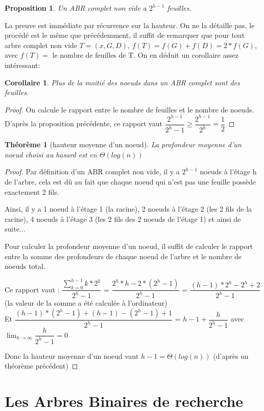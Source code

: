 \documentclass{report}
\newtheorem*{theo}{\textbf{Théorème}}
\newtheorem*{petiteprop}{Proposition}
\newtheorem*{cor}{Corollaire}
\begin{document}
\begin{petiteprop}
Un ABR complet non vide a $2^{h-1}$ feuilles.
\end{petiteprop}
La preuve est immédiate par récurrence sur la hauteur. On ne la détaille pas, le procédé est le même que précédemment, il suffit de remarquer que pour tout arbre complet non vide $T = (x,G,D)$, $f(T) = f(G) + f(D) = 2*f(G)$, avec $f(T) =$ le nombre de feuilles de T.
On en déduit un corollaire assez intéressant: 

\begin{cor}
Plus de la moitié des noeuds dans un ABR complet sont des feuilles. 
\end{cor}
\begin{proof}
On calcule le rapport entre le nombre de feuilles et le nombre de noeuds. 
D'après la proposition précédente, ce rapport vaut $\dfrac{2^{h-1}}{2^{h}-1 } \geq \dfrac{2^{h-1}}{2^{h}} = \dfrac{1}{2}$ 
\end{proof}

\begin{theo}[hauteur moyenne d'un noeud]
La profondeur moyenne d'un noeud choisi au hasard est en $\Theta(log(n))$
\end{theo}

\begin{proof}
Par définition d'un ABR complet non vide, il y a $2^{h-1}$ noeuds à l'étage h de l'arbre, cela est dû au fait que chaque noeud qui n'est pas une feuille possède exactement 2 fils. 

Ainsi, il y a 1 noeud à l'étage 1 (la racine), 2 noeuds à l'étage 2 (les 2 fils de la racine), 4 noeuds à l'étage 3 (les 2 fils des 2 noeuds de l'étage 1) et ainsi de suite... 

Pour calculer la profondeur moyenne d'un noeud, il suffit de calculer le rapport entre la somme des profondeurs de chaque noeud de l'arbre et le nombre de noeuds total. 

Ce rapport vaut :
$\dfrac{\sum_{k=0}^{h-1} k*2^k}{2^{h}-1}$ = $\dfrac{2^{h}*h-2*(2^{h}-1)}{2^{h}-1}$ = $\dfrac{(h-1)*2^{h}-2^{h}+2}{2^{h}-1}$ (la valeur de la somme a été calculée à l'ordinateur) \\
Et $\dfrac{(h-1)*(2^{h}-1)+(h-1)-(2^{h}-1)+1}{2^{h}-1}$ = $h-1 + \dfrac{h}{2^{h}-1}$ avec $\lim_{h\to\infty} \dfrac{h}{2^{h}-1}=0$ 

Donc la hauteur moyenne d'un noeud vaut $h-1=\Theta(log(n))$ (d'après un théorème précédent)
\end{proof}

\chapter{Les Arbres Binaires de recherche}
\end{document}
